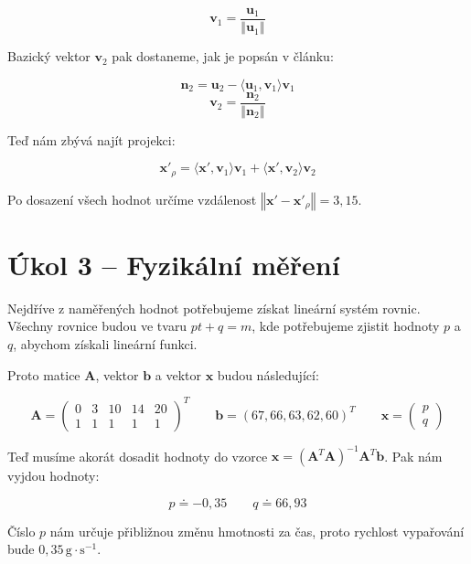 \documentclass{fkssolpub}
\begin{document}
\[
  \mathbf{v}_1 = \frac{\mathbf{u}_1}{\left\Vert \mathbf{u}_1 \right\Vert}
\]

Bazický vektor $\mathbf{v}_2$ pak dostaneme, jak je popsán v článku:

\[
  \mathbf{n}_2 = \mathbf{u}_2 - \langle \mathbf{u}_1, \mathbf{v}_1 \rangle
    \mathbf{v}_1
\]
\[
  \mathbf{v}_2 = \frac{\mathbf{n}_2}{\left\Vert \mathbf{n}_2 \right\Vert}
\]

Teď nám zbývá najít projekci:

\[
  \mathbf{x}'_{\rho} = \langle \mathbf{x}', \mathbf{v}_1 \rangle \mathbf{v}_1 + 
    \langle \mathbf{x}', \mathbf{v}_2 \rangle \mathbf{v}_2
\]

Po dosazení všech hodnot určíme vzdálenost
$\left\Vert \mathbf{x}' - \mathbf{x}'_{\rho} \right\Vert = 3,15$.

\section{Úkol 3 -- Fyzikální měření}

Nejdříve z naměřených hodnot potřebujeme získat lineární systém rovnic.
Všechny rovnice budou ve tvaru $pt + q = m$, kde potřebujeme zjistit hodnoty
$p$ a $q$, abychom získali lineární funkci.

Proto matice $\mathbf{A}$, vektor $\mathbf{b}$ a vektor $\mathbf{x}$ budou následující:

\[
  \mathbf{A} = \begin{pmatrix}
    0 & 3 & 10 & 14 & 20 \\
    1 & 1 & 1 & 1 & 1
  \end{pmatrix}^T
  \qquad
  \mathbf{b} = (67, 66, 63, 62, 60)^T \qquad \mathbf{x} = \begin{pmatrix}
    p \\ q
  \end{pmatrix}
\]

Teď musíme akorát dosadit hodnoty do vzorce $\mathbf{x} = 
(\mathbf{A}^T \mathbf{A})^{-1} \mathbf{A}^T \mathbf{b}$. Pak nám vyjdou
hodnoty:

\[
  p \doteq -0,35 \qquad q \doteq 66,93
\]

Číslo $p$ nám určuje přibližnou změnu hmotnosti za čas, proto rychlost vypařování
bude $0,35 \, \text{g} \cdot \text{s}^{-1}$.
  
\end{document}

